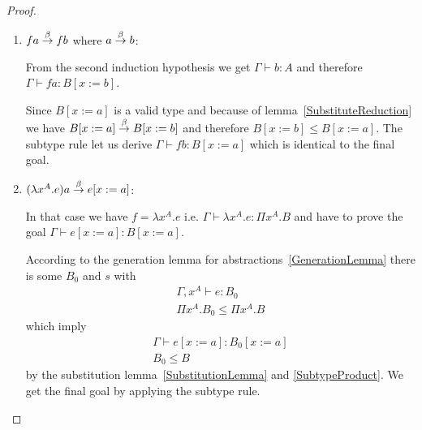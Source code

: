 \begin{theorem}
{\begin{proof}
\begin{enumerate}
\begin{enumerate}
\begin{enumerate}
\begin{enumerate}
                        \item $f a \stackrel{\beta}{\to} f b$ where $a \stackrel{\beta}{\to} b$:

                            From the second induction hypothesis we get
                            $\Gamma \vdash b: A$ and therefore $\Gamma \vdash f
                            a : B[x:=b]$.

                            Since $B[x:=a]$ is a valid type and because of
                            lemma~\ref{SubstituteReduction} we have $B[x:=a]
                            \stackrel{\beta}{\to} B[x:=b]$ and therefore $B[x:=b] \le
                            B[x:=a]$. The subtype rule let us derive
                            $\Gamma \vdash f b: B[x:=a]$ which is identical to
                            the final goal.

                        \item $(\lambda x^A. e) a \stackrel{\beta}{\to} e[x:=a]$:

                            In that case we have $f = \lambda x^A. e$ i.e.
                            $\Gamma \vdash \lambda x^A. e: \Pi x^A. B$ and have
                            to prove the goal $\Gamma \vdash e[x:=a] : B[x:=a]$.

                            According to the generation lemma for
                            abstractions~\ref{GenerationLemma} there is some
                            $B_0$ and $s$ with
                            $$
                            \begin{array}{l}
                                \Gamma,x^A \vdash e: B_0
                                \\
                                \Pi x^A.  B_0 \le \Pi x^A.B
                            \end{array}
                            $$
                            which imply
                            $$
                            \begin{array}{l}
                                \Gamma \vdash e[x:=a]: B_0[x:=a]
                                \\
                                B_0 \le B
                            \end{array}
                            $$
                            by the substitution lemma~\ref{SubstitutionLemma}
                            and \ref{SubtypeProduct}. We get the final goal by
                            applying the subtype rule.
                    \end{enumerate}


\end{enumerate}
\end{enumerate}
\end{enumerate}
\end{proof}}
\end{theorem}
